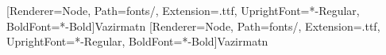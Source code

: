 %
%
%

\usepackage{tikz}
\usepackage{pgfplots}
\pgfplotsset{compat=1.18}
\usetikzlibrary{arrows.meta}

\usepackage{mathtools}

\usepackage[bidi=basic]{babel}
[Renderer=Node, Path=fonts/, Extension=.ttf, UprightFont=*-Regular, BoldFont=*-Bold]{Vazirmatn}
[Renderer=Node, Path=fonts/, Extension=.ttf, UprightFont=*-Regular, BoldFont=*-Bold]{Vazirmatn}

